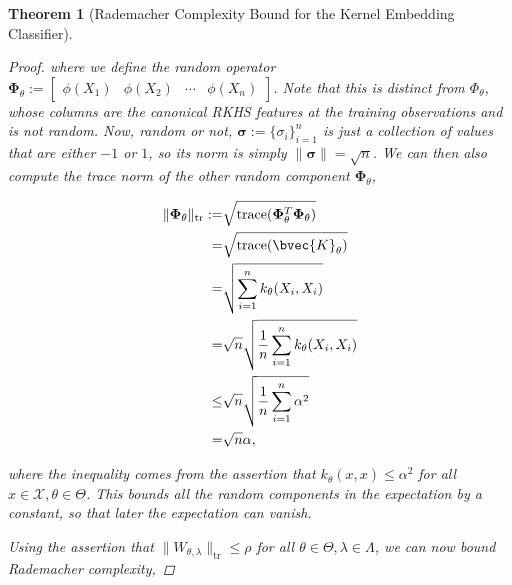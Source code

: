 \documentclass{article}
\newtheorem{theorem}{Theorem}[section]
\begin{document}
\begin{theorem}[Rademacher Complexity Bound for the Kernel Embedding Classifier]
\begin{proof}
				where we define the random operator $\bm{\Phi}_{\theta} := \begin{bmatrix} \phi(X_{1}) & \phi(X_{2}) & \cdots & \phi(X_{n}) \end{bmatrix}$. Note that this is distinct from $\Phi_{\theta}$, whose columns are the canonical RKHS features at the training observations and is not random. Now, random or not, $\bm{\sigma} := \{\sigma_{i}\}_{i = 1}^{n}$ is just a collection of values that are either $-1$ or $1$, so its norm is simply $\| \bm{\sigma} \| = \sqrt{n}$. We can then also compute the trace norm of the other random component $\bm{\Phi}_{\theta}$,
				
				\begin{equation}
					\begin{aligned}
						\| \bm{\Phi}_{\theta} \|_{\mathrm{tr}} :=& \sqrt{\mathrm{trace}(\bm{\Phi}_{\theta}^{T} \bm{\Phi}_{\theta})} \\
						=& \sqrt{\mathrm{trace}(\bvec{K}_{\theta})} \\
						=& \sqrt{\sum_{i = 1}^{n} k_{\theta}(X_{i}, X_{i})} \\
						=& \sqrt{n} \sqrt{ \frac{1}{n} \sum_{i = 1}^{n} k_{\theta}(X_{i}, X_{i})} \\
						\leq& \sqrt{n} \sqrt{ \frac{1}{n} \sum_{i = 1}^{n} \alpha^{2}} \\
						=& \sqrt{n} \alpha,
					\end{aligned}
				\end{equation}
				
				where the inequality comes from the assertion that $k_{\theta}(x, x) \leq \alpha^{2}$ for all $x \in \mathcal{X}, \theta \in \Theta$. This bounds all the random components in the expectation by a constant, so that later the expectation can vanish. 
				
				Using the assertion that $\| W_{\theta, \lambda} \|_{\mathrm{tr}} \leq \rho$ for all $\theta \in \Theta, \lambda \in \Lambda$, we can now bound Rademacher complexity,
				

\end{proof}
\end{theorem}
\end{document}
